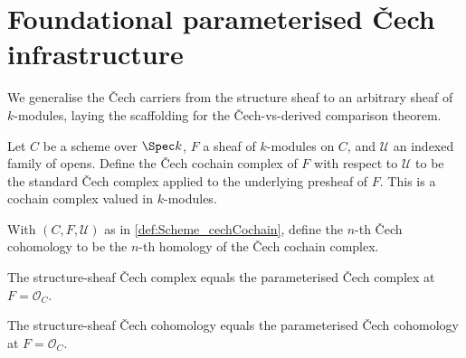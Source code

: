 \section{Foundational parameterised \v{C}ech infrastructure}
\label{sec:moduleK_cech_parameterised}

We generalise the \v{C}ech carriers from the structure sheaf to an arbitrary sheaf of \(k\)-modules, laying the scaffolding for the \v{C}ech-vs-derived comparison theorem.

\begin{definition}
  \label{def:Scheme_cechCochain}
  
  Let \(C\) be a scheme over \(\Spec k\), \(F\) a sheaf of \(k\)-modules on \(C\), and \(\mathcal U\) an indexed family of opens. Define the \v{C}ech cochain complex of \(F\) with respect to \(\mathcal U\) to be the standard \v{C}ech complex applied to the underlying presheaf of \(F\). This is a cochain complex valued in \(k\)-modules.
\end{definition}

\begin{definition}
  \label{def:Scheme_cechCohomology}
  With \((C, F, \mathcal U)\) as in \cref{def:Scheme_cechCochain}, define the \(n\)-th \v{C}ech cohomology to be the \(n\)-th homology of the \v{C}ech cochain complex.
\end{definition}

\begin{theorem}
  \label{thm:Scheme_cechCochain_OC_eq}
  The structure-sheaf \v{C}ech complex equals the parameterised \v{C}ech complex at \(F = \mathcal O_C\).
\end{theorem}

\begin{theorem}
  \label{thm:Scheme_cechCohomology_OC_eq}
  The structure-sheaf \v{C}ech cohomology equals the parameterised \v{C}ech cohomology at \(F = \mathcal O_C\).
\end{theorem}

